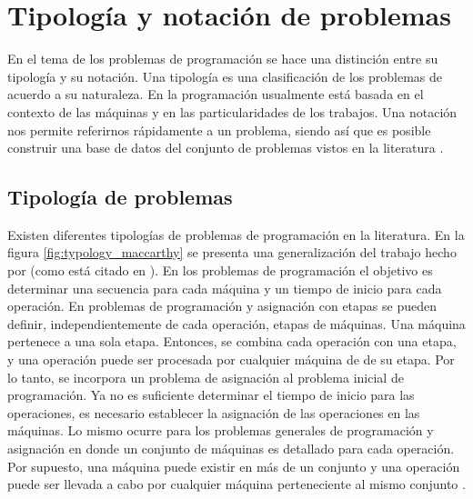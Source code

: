 \documentclass[spanish,draft,12pt,headsepline,footsepline,paper=letter]{scrreprt}
\begin{document}
\section{Tipología y notación de problemas}

En el tema de los problemas de programación se hace una distinción entre su tipología y su notación. Una tipología es una clasificación de los problemas de acuerdo a su naturaleza. En la programación usualmente está basada en el contexto de las máquinas y en las particularidades de los trabajos. Una notación nos permite referirnos rápidamente a un problema, siendo así que es posible construir una base de datos del conjunto de problemas vistos en la literatura \citep[p.~14]{TKindt2002}.

\subsection{Tipología de problemas}

Existen diferentes tipologías de problemas de programación en la literatura. En la figura \ref{fig:typology_maccarthy} se presenta una generalización del trabajo hecho por \citet{maccarthy1993addressing} (como está citado en \citealp[p.~14]{TKindt2002}). En los problemas de programación el objetivo es determinar una secuencia para cada máquina y un tiempo de inicio para cada operación. En problemas de programación y asignación con etapas se pueden definir, independientemente de cada operación, etapas de máquinas. Una máquina pertenece a una sola etapa. Entonces, se combina cada operación con una etapa, y una operación puede ser procesada por cualquier máquina de de su etapa. Por lo tanto, se incorpora un problema de asignación al problema inicial de programación. Ya no es suficiente determinar el tiempo de inicio para las operaciones, es necesario establecer la asignación de las operaciones en las máquinas. Lo mismo ocurre para los problemas generales de programación y asignación en donde un conjunto de máquinas es detallado para cada operación. Por supuesto, una máquina puede existir en más de un conjunto y una operación puede ser llevada a cabo por cualquier máquina perteneciente al mismo conjunto \citep[p.~14,~15]{TKindt2002}.
\end{document}

